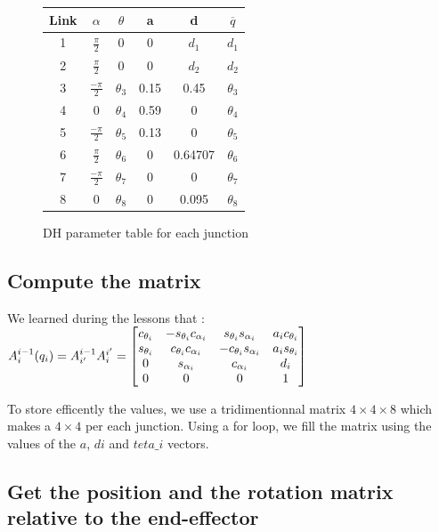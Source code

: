 \documentclass[english,a4paper,11pt]{report}
\begin{document}
	\begin{figure}
	\centering
		\begin{tabular}{c|c|c|c|c|c}
		Link & $\alpha$ & $\theta$ & a & d & $ \overline{q}$\\
		\hline
		1 & $\frac{\pi}{2}$ & 0 & 0 & $d_1$ &$ d_1$\\
		\hline
		2 & $\frac{\pi}{2}$ & 0 & 0 & $d_2$ & $d_2$\\
		\hline
		3 & $\frac{-\pi}{2}$ & $\theta_3$ & 0.15 & 0.45 & $\theta_3$\\
		\hline
		4 & 0 & $\theta_4$ & 0.59 & 0 & $\theta_4$\\
		\hline
		5 & $\frac{-\pi}{2}$ & $\theta_5$ & 0.13 & 0 & $\theta_5$ \\
		\hline
		6 & $\frac{\pi}{2}$ & $\theta_6$ & 0 & 0.64707 & $\theta_6$\\
		\hline
		7 & $\frac{-\pi}{2}$ & $\theta_7$ & 0 & 0 & $\theta_7$ \\
		\hline
		8 & 0 & $\theta_8$ & 0 & 0.095 & $\theta_8$\\
		\end{tabular}
		\caption{DH parameter table for each junction}
	\end{figure}

	
	
	\subsection{Compute the matrix}
	We learned during the lessons that :
	$A^{i-1}_{i}(q_{i}) = A^{i-1}_{i\rq{}}A^{i\rq{}}_{i} = 
	\begin{bmatrix} 
	c_{\theta_{i}} & - s_{\theta_{i}} c_{\alpha_{i}} & s_{\theta_{i}} s_{\alpha_{i}} & a_{i} c_{\theta_{i}}\\
	s_{\theta_{i}} &  c_{\theta_{i}} c_{\alpha_{i}} & -c_{\theta_{i}} s_{\alpha_{i}} & a_{i} s_{\theta_{i}}\\
	0 &  s_{\alpha_{i}}  & c_{\alpha_{i}} & d_{i}\\
	0 & 0 & 0 & 1
	\end{bmatrix} $

	To store efficently the values, we use a tridimentionnal matrix $4\times4\times8$ which makes a $4\times4$ per each junction. Using a for loop, we fill the matrix using the values of the $a$, $di$ and $teta\_i$ vectors.
	
	\subsection{Get the position and the rotation matrix relative to the end-effector}
	
\end{document}

